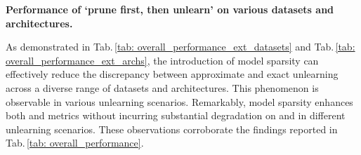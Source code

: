 \noindent \textbf{Performance of `prune first, then unlearn' on various datasets and architectures.}

As demonstrated in Tab.\,\ref{tab: overall_performance_ext_datasets} and Tab.\,\ref{tab: overall_performance_ext_archs}, the introduction of model sparsity can effectively reduce the discrepancy between approximate and exact unlearning across a diverse range of datasets and architectures. This phenomenon is observable in various unlearning scenarios. Remarkably, model sparsity enhances both {\UA} and {\MIAF} metrics without incurring substantial degradation on {\RA} and {\TA} in different unlearning scenarios. These observations corroborate the findings reported in Tab.\,\ref{tab: overall_performance}. 

